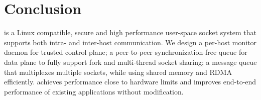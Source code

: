 \section{Conclusion}
\label{sec:conclusion}


\sys{} is a Linux compatible, secure and high performance user-space socket system that supports both intra- and inter-host communication.
We design a per-host monitor daemon for trusted control plane;
a peer-to-peer synchronization-free queue for data plane to fully support fork and multi-thread socket sharing;
a message queue that multiplexes multiple sockets, while using shared memory and RDMA efficiently.
\sys{} achieves performance close to hardware limits and improves end-to-end performance of existing applications without modification.

